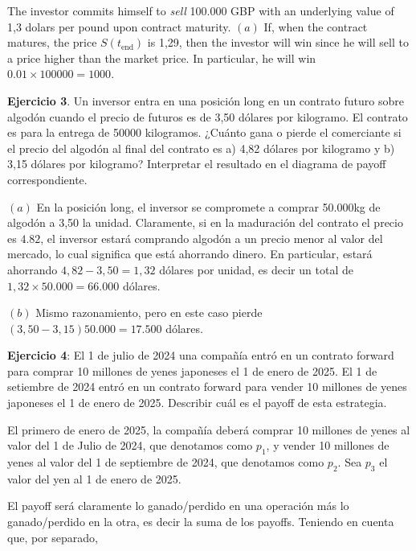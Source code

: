 \documentclass[a4paper, 12pt]{article}
\theoremstyle{definition}
\begin{document}
The investor commits himself to \textit{sell} 100.000 GBP with an underlying
value of 1,3 dolars per pound upon contract maturity. $(a)$ If, when the
contract matures, the price $S(t_{\text{end}})$ is 1,29, then the investor will
win since he will sell to a price higher than the market price. In particular,
he will win $0.01 \times 100000 = 1000$.

\pagebreak 

\begin{shaded}
    \textbf{Ejercicio 3}. Un inversor entra en una posición long en un contrato futuro
    sobre algodón cuando el precio de futuros es de 3,50 dólares por
    kilogramo. El contrato es para la entrega de 50000 kilogramos. ¿Cuánto gana
    o pierde el comerciante si el precio del algodón al final del contrato es a)
    4,82 dólares por kilogramo y b) 3,15 dólares por kilogramo? Interpretar el
    resultado en el diagrama de payoff correspondiente.
\end{shaded}

$(a)$ En la posición long, el inversor se compromete a comprar 50.000kg de
algodón a 3,50 la unidad. Claramente, si en la maduración del contrato el precio
es $4.82$, el inversor estará comprando algodón a un precio menor al valor del
mercado, lo cual significa que está ahorrando dinero. En particular, estará
ahorrando $4,82 - 3,50 = 1,32$ dólares por unidad, es decir un total de 
$1,32 \times 50.000 = 66.000$ dólares.

$(b)$ Mismo razonamiento, pero en este caso pierde $(3,50 - 3,15)50.000 =
17.500$ dólares.

\pagebreak 

\begin{shaded}
    \textbf{Ejercicio 4}: El 1 de julio de 2024 una compañía entró en un contrato forward
    para comprar 10 millones de yenes japoneses el 1 de enero de 2025. El 1 de
    setiembre de 2024 entró en un contrato forward para vender 10 millones de
    yenes japoneses el 1 de enero de 2025. Describir cuál es el payoff de esta
    estrategia.
\end{shaded}

El primero de enero de 2025, la compañía deberá comprar 10 millones de yenes al
valor del 1 de Julio de 2024, que denotamos como $p_1$, y vender 10 millones de
yenes al valor del 1 de septiembre de 2024, que denotamos como $p_2$. Sea $p_3$ el
valor del yen al 1 de enero de 2025.

El payoff será claramente lo ganado/perdido en una operación más lo
ganado/perdido en la otra, es decir la suma de los payoffs. Teniendo en cuenta
que, por separado,
\end{document}

